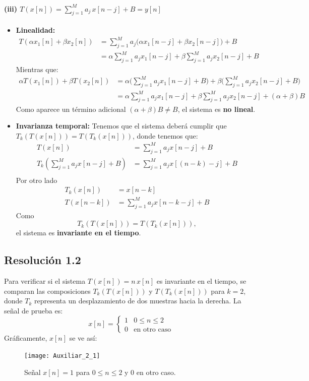 \documentclass[
  11pt,
  letterpaper,
   addpoints,
  ]{exam}
\begin{document}
\begin{questions}
\begin{solution}
  \paragraph{(iii) $T(x[n]) = \sum_{j=1}^{M} a_j \, x[n-j] + B = y[n]$}
\begin{itemize}
  \item \textbf{Linealidad:}
  \begin{align}
  T(\alpha x_1[n] + \beta x_2[n]) 
    &= \sum_{j=1}^{M} a_j \big( \alpha x_1[n-j] + \beta x_2[n-j] \big) + B \\
    &= \alpha \sum_{j=1}^{M} a_j x_1[n-j] + \beta \sum_{j=1}^{M} a_j x_2[n-j] + B
  \end{align}
  Mientras que:
  \begin{align}
  \alpha T(x_1[n]) + \beta T(x_2[n]) 
    &= \alpha \Big( \sum_{j=1}^{M} a_j x_1[n-j] + B \Big) 
     + \beta \Big( \sum_{j=1}^{M} a_j x_2[n-j] + B \Big) \\
    &= \alpha \sum_{j=1}^{M} a_j x_1[n-j] + \beta \sum_{j=1}^{M} a_j x_2[n-j] + (\alpha+\beta)B
  \end{align}
  Como aparece un término adicional $(\alpha+\beta)B \neq B$, el sistema es \textbf{no lineal}.
  \item \textbf{Invarianza temporal:}
  Tenemos que el sistema deberá cumplir que $T_{k}(T(x[n])) = T(T_{k}(x[n]))$, donde tenemos que:
  \begin{align}
  T(x[n]) &= \sum_{j=1}^{M} a_j x[n-j] + B  \\
  T_k(\sum_{j=1}^{M} a_j x[n-j] + B ) &= \sum_{j=1}^{M} a_j x[(n-k)-j] + B \\
  \end{align}
  Por otro lado
  \begin{align}
  T_k(x[n]) &= x[n-k]\\
  T(x[n-k]) &= \sum_{j=1}^{M} a_j x[n-k-j] + B
  \end{align}
  Como
  \begin{equation}
  T_k(T(x[n])) = T(T_k(x[n])),
  \end{equation}
  el sistema es \textbf{invariante en el tiempo}.
\end{itemize}
\subsection*{Resolución 1.2}

Para verificar si el sistema $T(x[n]) = n\,x[n]$ es invariante en el tiempo, se comparan las composiciones $T_k(T(x[n]))$ y $T(T_k(x[n]))$ para $k = 2$, donde $T_k$ representa un desplazamiento de dos muestras hacia la derecha. La señal de prueba es:
\begin{equation}
x[n] = \begin{cases}
1 & 0 \leq n \leq 2 \\
0 & \text{en otro caso}
\end{cases}
\end{equation}
Gráficamente, $x[n]$ se ve así:
\begin{figure}[H]
  \centering
  \texttt{[image: Auxiliar\_2\_1]}
  \caption{Señal $x[n] = 1$ para $0\le n\le 2$ y 0 en otro caso.}
\end{figure}


\end{solution}
\end{questions}
\end{document}
